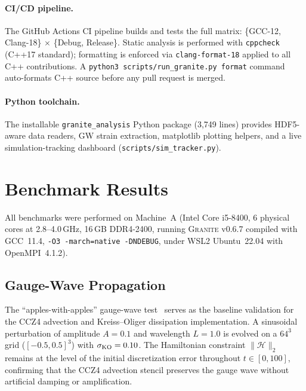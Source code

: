 \documentclass[aps,prd,twocolumn,superscriptaddress,nofootinbib,showpacs,
               longbibliography]{revtex4-2}
\newcommand{\granite}{\textsc{Granite}}
\newcommand{\code}[1]{\texttt{#1}}
\newcommand{\norm}[1]{\|#1\|}
\begin{document}
\paragraph{CI/CD pipeline.}
The GitHub Actions CI pipeline builds and tests the full matrix:
\{GCC-12, Clang-18\} $\times$ \{Debug, Release\}.
Static analysis is performed with \code{cppcheck} (C++17 standard);
formatting is enforced via \code{clang-format-18} applied to all C++
contributions.
A \code{python3 scripts/run\_granite.py format} command
auto-formats C++ source before any pull request is merged.

\paragraph{Python toolchain.}
The installable \code{granite\_analysis} Python package (3{,}749 lines)
provides HDF5-aware data readers, GW strain extraction, matplotlib
plotting helpers, and a live simulation-tracking dashboard
(\code{scripts/sim\_tracker.py}).

\section{Benchmark Results}
\label{sec:benchmarks}

All benchmarks were performed on Machine~A (Intel Core i5-8400, 6 physical
cores at 2.8--4.0\,GHz, 16\,GB DDR4-2400, running \granite{} v0.6.7 compiled
with GCC~11.4, \code{-O3 -march=native -DNDEBUG}, under WSL2 Ubuntu~22.04
with OpenMPI~4.1.2).

\subsection{Gauge-Wave Propagation}
\label{sec:gw_bench}

The ``apples-with-apples'' gauge-wave test~\cite{Alcubierre2008} serves as
the baseline validation for the CCZ4 advection and Kreiss--Oliger
dissipation implementation.
A sinusoidal perturbation of amplitude $A = 0.1$ and wavelength $L = 1.0$
is evolved on a $64^3$ grid ($[-0.5, 0.5]^3$) with $\sigma_{\rm KO} = 0.10$.
The Hamiltonian constraint $\norm{\mathcal{H}}_2$ remains at the level of
the initial discretization error throughout $t \in [0, 100]$, confirming
that the CCZ4 advection stencil preserves the gauge wave without artificial
damping or amplification.
\end{document}
